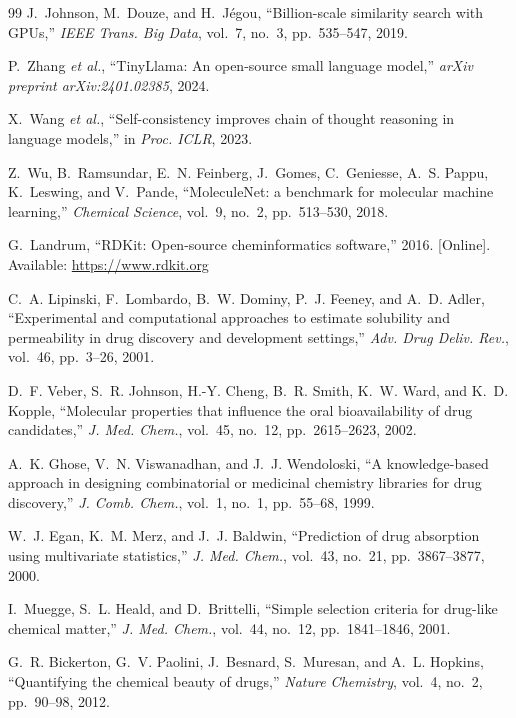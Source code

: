 \documentclass[conference]{IEEEtran}
\begin{document}
\begin{thebibliography}{99}
J.~Johnson, M.~Douze, and H.~J{\'e}gou, ``Billion-scale similarity search with GPUs,'' \textit{IEEE Trans. Big Data}, vol.~7, no.~3, pp.~535--547, 2019.

P.~Zhang \textit{et al.}, ``TinyLlama: An open-source small language model,'' \textit{arXiv preprint arXiv:2401.02385}, 2024.

X.~Wang \textit{et al.}, ``Self-consistency improves chain of thought reasoning in language models,'' in \textit{Proc. ICLR}, 2023.

Z.~Wu, B.~Ramsundar, E.~N. Feinberg, J.~Gomes, C.~Geniesse, A.~S. Pappu, K.~Leswing, and V.~Pande, ``MoleculeNet: a benchmark for molecular machine learning,'' \textit{Chemical Science}, vol.~9, no.~2, pp.~513--530, 2018.

G.~Landrum, ``RDKit: Open-source cheminformatics software,'' 2016. [Online]. Available: \url{https://www.rdkit.org}

C.~A. Lipinski, F.~Lombardo, B.~W. Dominy, P.~J. Feeney, and A.~D. Adler, ``Experimental and computational approaches to estimate solubility and permeability in drug discovery and development settings,'' \textit{Adv. Drug Deliv. Rev.}, vol.~46, pp.~3--26, 2001.

D.~F. Veber, S.~R. Johnson, H.-Y. Cheng, B.~R. Smith, K.~W. Ward, and K.~D. Kopple, ``Molecular properties that influence the oral bioavailability of drug candidates,'' \textit{J. Med. Chem.}, vol.~45, no.~12, pp.~2615--2623, 2002.

A.~K. Ghose, V.~N. Viswanadhan, and J.~J. Wendoloski, ``A knowledge-based approach in designing combinatorial or medicinal chemistry libraries for drug discovery,'' \textit{J. Comb. Chem.}, vol.~1, no.~1, pp.~55--68, 1999.

W.~J. Egan, K.~M. Merz, and J.~J. Baldwin, ``Prediction of drug absorption using multivariate statistics,'' \textit{J. Med. Chem.}, vol.~43, no.~21, pp.~3867--3877, 2000.

I.~Muegge, S.~L. Heald, and D.~Brittelli, ``Simple selection criteria for drug-like chemical matter,'' \textit{J. Med. Chem.}, vol.~44, no.~12, pp.~1841--1846, 2001.

G.~R. Bickerton, G.~V. Paolini, J.~Besnard, S.~Muresan, and A.~L. Hopkins, ``Quantifying the chemical beauty of drugs,'' \textit{Nature Chemistry}, vol.~4, no.~2, pp.~90--98, 2012.


\end{thebibliography}
\end{document}
